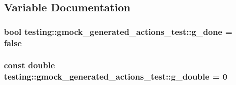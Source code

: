 \subsection{Variable Documentation}
\subsubsection[{\texorpdfstring{g\+\_\+done}{g_done}}]{\setlength{\rightskip}{0pt plus 5cm}bool testing\+::gmock\+\_\+generated\+\_\+actions\+\_\+test\+::g\+\_\+done = false}\hypertarget{namespacetesting_1_1gmock__generated__actions__test_a5f828d39e27f0615498d5aa31c96916e}{}\label{namespacetesting_1_1gmock__generated__actions__test_a5f828d39e27f0615498d5aa31c96916e}
\subsubsection[{\texorpdfstring{g\+\_\+double}{g_double}}]{\setlength{\rightskip}{0pt plus 5cm}const double testing\+::gmock\+\_\+generated\+\_\+actions\+\_\+test\+::g\+\_\+double = 0}\hypertarget{namespacetesting_1_1gmock__generated__actions__test_aa10d8101300a51dd20ab028fa9971313}{}\label{namespacetesting_1_1gmock__generated__actions__test_aa10d8101300a51dd20ab028fa9971313}
